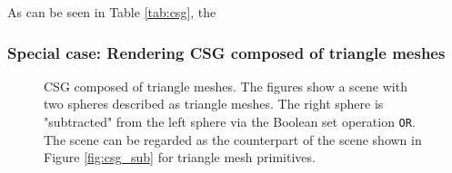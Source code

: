 As can be seen in Table \ref{tab:csg}, the 

\subsubsection{Special case: Rendering CSG composed of triangle meshes}

\begin{figure}[h]
	\centering
	\hfil
	\caption{CSG composed of triangle meshes. The figures show a scene with two spheres described as triangle meshes. The right sphere is "subtracted" from the left sphere via the Boolean set operation \texttt{OR}. The scene can be regarded as the counterpart of the scene shown in Figure \ref{fig:csg_sub} for triangle mesh primitives.}
	\label{fig:csg_mesh_results}
\end{figure}

